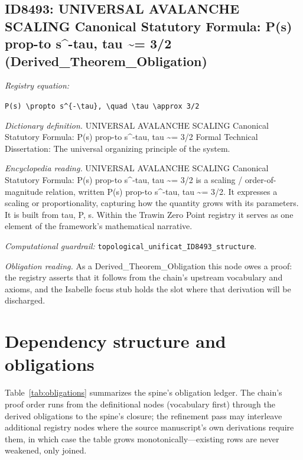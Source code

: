 \documentclass[11pt]{article}
\theoremstyle{remark}
\begin{document}
\subsection{ID8493: UNIVERSAL AVALANCHE SCALING Canonical Statutory Formula: P(s) prop-to s\textasciicircum{}-tau, tau \textasciitilde{}= 3/2 (Derived\_Theorem\_Obligation)}

\noindent\textit{Registry equation:}\par
{\small\texttt{P(s) \textbackslash{}propto s\textasciicircum{}\{-\textbackslash{}tau\}, \textbackslash{}quad \textbackslash{}tau \textbackslash{}approx 3/2}}\par\medskip
\noindent\textit{Dictionary definition.} UNIVERSAL AVALANCHE SCALING Canonical Statutory Formula: P(s) prop-to s\textasciicircum{}-tau, tau \textasciitilde{}= 3/2 Formal Technical Dissertation: The universal organizing principle of the system.\par\medskip
\noindent\textit{Encyclopedia reading.} UNIVERSAL AVALANCHE SCALING Canonical Statutory Formula: P(s) prop-to s\textasciicircum{}-tau, tau \textasciitilde{}= 3/2 is a scaling / order-of-magnitude relation, written P(s) prop-to s\textasciicircum{}-tau, tau \textasciitilde{}= 3/2. It expresses a scaling or proportionality, capturing how the quantity grows with its parameters. It is built from tau, P, s. Within the Trawin Zero Point registry it serves as one element of the framework's mathematical narrative.
\par\medskip\noindent\textit{Computational guardrail:} \texttt{topological\_unificat\_ID8493\_structure}.
\par\medskip\noindent\textit{Obligation reading.} As a Derived\_Theorem\_Obligation this node owes a proof: the registry asserts that it follows from the chain's upstream vocabulary and axioms, and the Isabelle focus stub holds the slot where that derivation will be discharged.

\section{Dependency structure and obligations}
\label{sec:dep}

Table~\ref{tab:obligations} summarizes the spine's obligation ledger. The chain's proof order runs from the definitional nodes (vocabulary first) through the derived obligations to the spine's closure; the refinement pass may interleave additional registry nodes where the source manuscript's own derivations require them, in which case the table grows monotonically---existing rows are never weakened, only joined.
\end{document}
